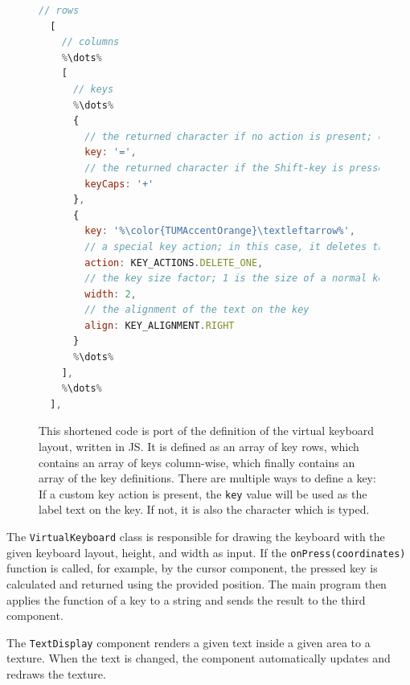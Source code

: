 \begin{figure}[H]
	\begin{lstlisting}[language=JavaScript]
  // rows
  [
    // columns
    %\dots%
    [ 
      // keys
      %\dots%
      {
        // the returned character if no action is present; otherwise just a label
        key: '=',
        // the returned character if the Shift-key is pressed
        keyCaps: '+'
      },
      {
        key: '%\color{TUMAccentOrange}\textleftarrow%',
        // a special key action; in this case, it deletes the last character
        action: KEY_ACTIONS.DELETE_ONE,
        // the key size factor; 1 is the size of a normal key
        width: 2, 
        // the alignment of the text on the key
        align: KEY_ALIGNMENT.RIGHT
      }
      %\dots%
    ],
    %\dots%
  ],
  \end{lstlisting}
	\caption[Virtual keyboard layout definition]{This shortened code is port of the definition of the virtual keyboard layout, written in \gls{JS}. It is defined as an array of key rows, which contains an array of keys column-wise, which finally contains an array of the key definitions. There are multiple ways to define a key: If a custom key action is present, the \lstinline{key} value will be used as the label text on the key. If not, it is also the character which is typed.}\label{fig:virtual-keyboard-layout}
\end{figure}

The \lstinline{VirtualKeyboard} class is responsible for drawing the keyboard with the given keyboard layout, height, and width as input. If the \lstinline{onPress(coordinates)} function is called, for example, by the cursor component, the pressed key is calculated and returned using the provided position. The main program then applies the function of a key to a string and sends the result to the third component. %

The \lstinline{TextDisplay} component renders a given text inside a given area to a texture. When the text is changed, the component automatically updates and redraws the texture.